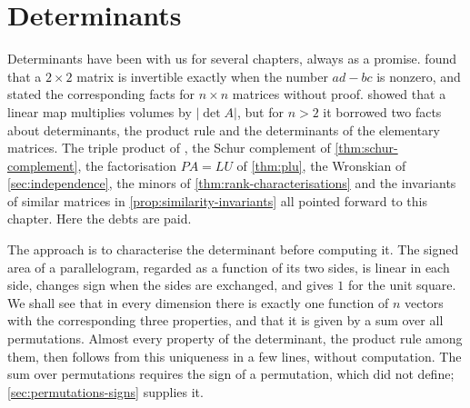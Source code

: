\chapter{Determinants}
\label{ch:determinants}


Determinants have been with us for several chapters, always as a promise.  found that a $2\times2$ matrix is invertible exactly when the number $ad-bc$ is nonzero, and  stated the corresponding facts for $n\times n$ matrices without proof.  showed that a linear map multiplies volumes by $|\det A|$, but for $n>2$ it borrowed two facts about determinants, the product rule and the determinants of the elementary matrices. The triple product of , the Schur complement of \cref{thm:schur-complement}, the factorisation $PA=LU$ of \cref{thm:plu}, the Wronskian of \cref{sec:independence}, the minors of \cref{thm:rank-characterisations} and the invariants of similar matrices in \cref{prop:similarity-invariants} all pointed forward to this chapter. Here the debts are paid.

The approach is to characterise the determinant before computing it. The signed area of a parallelogram, regarded as a function of its two sides, is linear in each side, changes sign when the sides are exchanged, and gives $1$ for the unit square. We shall see that in every dimension there is exactly one function of $n$ vectors with the corresponding three properties, and that it is given by a sum over all permutations. Almost every property of the determinant, the product rule among them, then follows from this uniqueness in a few lines, without computation. The sum over permutations requires the sign of a permutation, which  did not define; \cref{sec:permutations-signs} supplies it.

